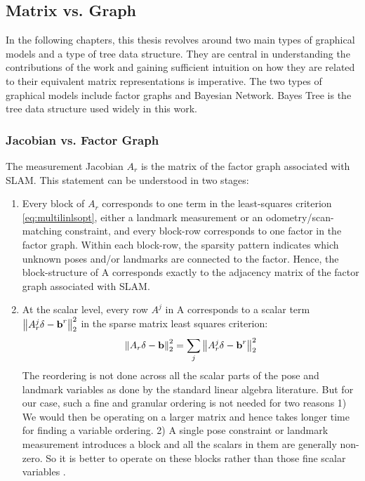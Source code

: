 \subsection{Matrix vs. Graph}
In the following chapters, this thesis revolves around two main types of graphical models and a type of tree data structure. They are central in understanding the contributions of the work and gaining sufficient intuition on how they are related to their equivalent matrix representations is imperative. The two types of graphical models include factor graphs \cite{factorgraph} and Bayesian Network. Bayes Tree \cite{kaessbayestree} is the tree data structure used widely in this work. 

\subsubsection{Jacobian vs. Factor Graph}
The measurement Jacobian $A_r$ is the matrix of the factor graph associated with SLAM. This statement can be understood in two stages: 
\begin{enumerate}
\item Every block of $A_r$ corresponds to one term in the least-squares criterion \ref{eq:multilinlsopt}, either a landmark measurement or an odometry/scan-matching  constraint, and every block-row corresponds to one factor in the factor graph. Within each block-row, the sparsity pattern indicates which unknown poses and/or landmarks are connected to the factor. Hence, the block-structure of A corresponds exactly to the adjacency matrix of the factor graph associated with SLAM.
\item At the scalar level, every row $A^j$ in A corresponds to a scalar term $\left\lVert A^j_r\delta - \textbf{b}^r\right\rVert^2_2$ in the sparse matrix least squares criterion:
\begin{equation}
\left\lVert A_r\delta - \textbf{b}\right\rVert^2_2 = \sum_j \left\lVert A^j_r\delta - \textbf{b}^r\right\rVert^2_2
\end{equation} 
The reordering is not done across all the scalar parts of the pose and landmark variables as done by the standard linear algebra literature. But for our case, such a fine and granular ordering is not needed for two reasons 1) We would then be operating on a larger matrix and hence takes longer time for finding a variable ordering. 2) A single pose constraint or landmark measurement introduces a block and all the scalars in them are generally non-zero. So it is better to operate on these blocks rather than those fine scalar variables \cite{dellaertsam}.
\end{enumerate}

